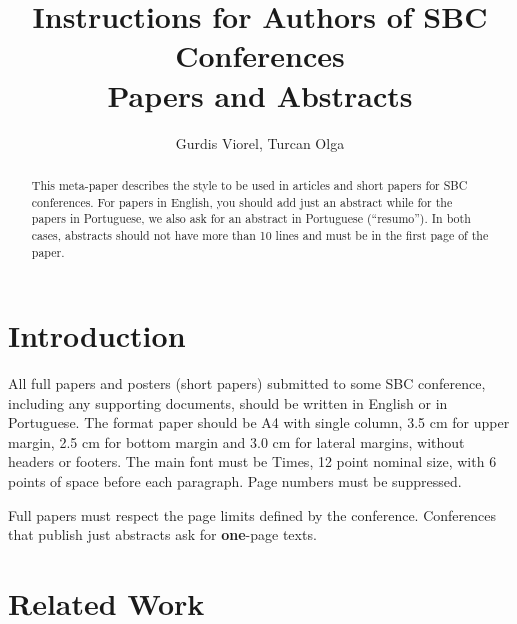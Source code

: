 \documentclass[12pt]{article}
\title{Instructions for Authors of SBC Conferences\\ Papers and Abstracts}
\author{Gurdis Viorel, Turcan Olga}
\begin{document}
 

\maketitle

\begin{abstract}
  This meta-paper describes the style to be used in articles and short papers
  for SBC conferences. For papers in English, you should add just an abstract
  while for the papers in Portuguese, we also ask for an abstract in
  Portuguese (``resumo''). In both cases, abstracts should not have more than
  10 lines and must be in the first page of the paper.
\end{abstract}


\section{Introduction}

All full papers and posters (short papers) submitted to some SBC conference,
including any supporting documents, should be written in English or in
Portuguese. The format paper should be A4 with single column, 3.5 cm for upper
margin, 2.5 cm for bottom margin and 3.0 cm for lateral margins, without
headers or footers. The main font must be Times, 12 point nominal size, with 6
points of space before each paragraph. Page numbers must be suppressed.

Full papers must respect the page limits defined by the conference.
Conferences that publish just abstracts ask for \textbf{one}-page texts.

\section{Related Work} \label{sec:firstpage}
\end{document}
